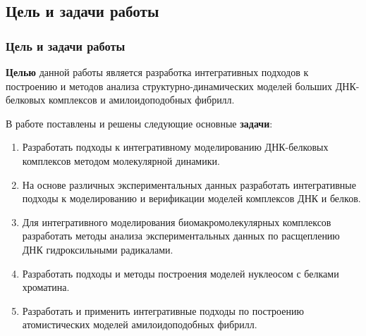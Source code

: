 \subsection{Цель и задачи работы}
\begin{frame}
    \frametitle{Цель и задачи работы}
    \textbf{Целью} данной работы является разработка интегративных подходов к построению и методов анализа структурно-динамических моделей больших ДНК-белковых комплексов и амилоидоподобных фибрилл.\\
\vspace{0.5cm}

    В работе поставлены и решены следующие основные \textbf{задачи}:
\begin{enumerate}
\justifying
  \item Разработать подходы к интегративному моделированию ДНК-белковых комплексов методом молекулярной динамики.


  \item На основе различных экспериментальных данных разработать интегративные подходы к моделированию и верификации моделей комплексов ДНК и белков.
  
  \item Для интегративного моделирования биомакромолекулярных комплексов разработать методы анализа экспериментальных данных по расщеплению ДНК гидроксильными радикалами.

   
  \item Разработать подходы и методы построения моделей нуклеосом с белками хроматина.

   \item Разработать и применить интегративные подходы по построению атомистических моделей амилоидоподобных фибрилл.
\end{enumerate}

\end{frame}


